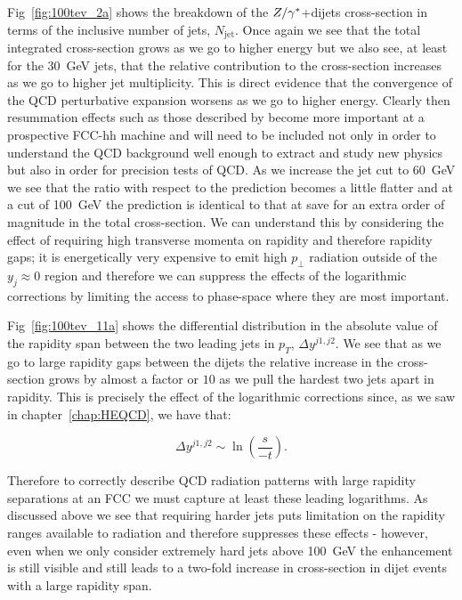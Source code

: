 	Fig~\eqref{fig:100tev_2a} shows the breakdown of the $Z/\gamma^*$+dijets cross-section in terms of the inclusive number
	of jets, $N_{\text{jet}}$.  Once again we see that the total integrated cross-section grows as we
	go to higher energy but we also see, at least for the 30~GeV jets, that the relative contribution to the cross-section
	increases as we go to higher jet multiplicity.  This is direct evidence that the convergence of the
	QCD perturbative expansion worsens as we go to higher energy.  Clearly then resummation effects
	such as those described by \hej become more important at a prospective FCC-hh machine and will need
	to be included not only in order to understand the QCD background well enough to extract and
	study new physics but also in order for precision tests of QCD.  As we increase the jet cut to 60~GeV
	we see that the ratio with respect to the \stev prediction becomes a little flatter and at a cut of 100~GeV
	the prediction is identical to that at \stev save for an extra order of magnitude in the total cross-section.
	We can understand this by considering the effect of requiring high transverse momenta on rapidity and therefore
	rapidity gaps; it is energetically very expensive to emit high $p_\perp$ radiation outside of the $y_j\approx0$ region
	and therefore we can suppress the effects of the logarithmic corrections by limiting the access to phase-space
	where they are most important.

	Fig~\eqref{fig:100tev_11a} shows the differential distribution in the absolute value of the
	rapidity span between the two leading jets in $p_T$, $\Delta y^{j1, j2}$.  We see that as we go to
	large rapidity gaps between the dijets the relative increase in the cross-section grows by almost a
	factor or $10$ as we pull the hardest two jets apart in rapidity.  This is precisely the effect of
	the logarithmic corrections since, as we saw in chapter~\ref{chap:HEQCD}, we have that:

	\begin{equation}
		\Delta y^{j1, j2}\sim \ln\left(\frac{s}{-t}\right).
	\end{equation}

	Therefore to correctly describe QCD radiation patterns with large rapidity separations at an FCC
	we must capture at least these leading logarithms.  As discussed above we see that requiring harder
	jets puts limitation on the rapidity ranges available to radiation and therefore suppresses these
	effects - however, even when we only consider extremely hard jets above 100~GeV the enhancement is
	still visible and still leads to a two-fold increase in cross-section in dijet events with a large
	rapidity span.

